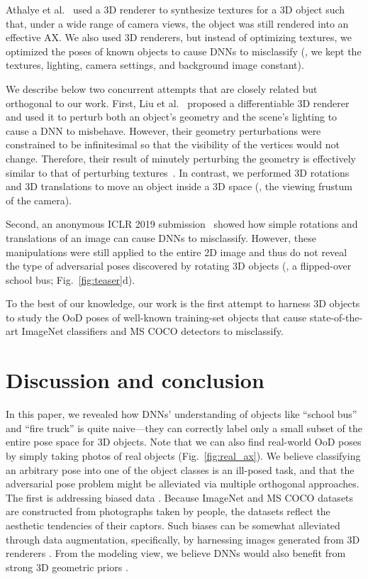 \documentclass[10pt,twocolumn,letterpaper]{article}
\newcommand{\subsec}[1]{\noindent{\textbf{#1.}}}
\begin{document}
\subsec{3D adversarial examples}
Athalye et al.~\cite{Athalye2017} used a 3D renderer to synthesize textures for a 3D object such that, under a wide range of camera views, the object was still rendered into an effective AX.
We also used 3D renderers, but instead of optimizing textures, we optimized the poses of known objects to cause DNNs to misclassify (\ie, we kept the textures, lighting, camera settings, and background image constant).


\subsec{Concurrent work}
We describe below two concurrent attempts that are closely related but orthogonal to our work.
First, Liu et al.~\cite{Liu2018} proposed a differentiable 3D renderer and used it to perturb both an object's geometry and the scene's lighting to cause a DNN to misbehave.
However, their geometry perturbations were constrained to be infinitesimal so that the visibility of the vertices would not change.
Therefore, their result of minutely perturbing the geometry is effectively similar to that of perturbing textures~\cite{Athalye2017}.
In contrast, we performed 3D rotations and 3D translations to move an object inside a 3D space (\ie, the viewing frustum of the camera).

Second, an anonymous ICLR 2019 submission~\cite{anonymous2019a} showed how simple rotations and translations of an image can cause DNNs to misclassify.
However, these manipulations were still applied to the entire 2D image and thus do not reveal the type of adversarial poses discovered by rotating 3D objects (\eg, a flipped-over school bus; Fig.~\ref{fig:teaser}d).

To the best of our knowledge, our work is the first attempt to harness 3D objects to study the OoD poses of well-known training-set objects that cause state-of-the-art ImageNet classifiers and MS COCO detectors to misclassify.





\section{Discussion and conclusion}

In this paper, we revealed how DNNs' understanding of objects like ``school bus'' and ``fire truck'' is quite naive---they can correctly label only a small subset of the entire pose space for 3D objects.
Note that we can also find real-world OoD poses by simply taking photos of real objects (Fig.~\ref{fig:real_ax}).
We believe classifying an arbitrary pose into one of the object classes is an ill-posed task, and that the adversarial pose problem might be alleviated via multiple orthogonal approaches.
The first is addressing biased data \cite{torralba2011unbiased}.
Because ImageNet and MS COCO datasets are constructed from photographs taken by people, the datasets reflect the aesthetic tendencies of their captors.
Such biases can be somewhat alleviated through data augmentation, specifically, by harnessing images generated from 3D renderers \cite{shrivastava2017learning,alhaija2018geometric}.
From the modeling view, we believe DNNs would also benefit from strong 3D geometric priors \cite{alhaija2018geometric}.
\end{document}
